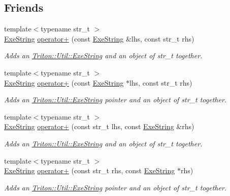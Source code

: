 \subsection*{Friends}
\begin{DoxyCompactItemize}
\item 
{\footnotesize template$<$typename str\+\_\+t $>$ }\\\hyperlink{class_triton_1_1_util_1_1_exe_string}{Exe\+String} \hyperlink{class_triton_1_1_util_1_1_exe_string_a39806d6e0c1844d9e262b196034caafb}{operator+} (const \hyperlink{class_triton_1_1_util_1_1_exe_string}{Exe\+String} \&lhs, const str\+\_\+t rhs)
\begin{DoxyCompactList}\small\item\em Adds an \hyperlink{class_triton_1_1_util_1_1_exe_string}{Triton\+::\+Util\+::\+Exe\+String} and an object of str\+\_\+t together. \end{DoxyCompactList}\item 
{\footnotesize template$<$typename str\+\_\+t $>$ }\\\hyperlink{class_triton_1_1_util_1_1_exe_string}{Exe\+String} \hyperlink{class_triton_1_1_util_1_1_exe_string_ac94b1281e2ba4a38327d8f096009d1e7}{operator+} (const \hyperlink{class_triton_1_1_util_1_1_exe_string}{Exe\+String} $\ast$lhs, const str\+\_\+t rhs)
\begin{DoxyCompactList}\small\item\em Adds an \hyperlink{class_triton_1_1_util_1_1_exe_string}{Triton\+::\+Util\+::\+Exe\+String} pointer and an object of str\+\_\+t together. \end{DoxyCompactList}\item 
{\footnotesize template$<$typename str\+\_\+t $>$ }\\\hyperlink{class_triton_1_1_util_1_1_exe_string}{Exe\+String} \hyperlink{class_triton_1_1_util_1_1_exe_string_a0ea829de41f245abec1708fa2afcc070}{operator+} (const str\+\_\+t lhs, const \hyperlink{class_triton_1_1_util_1_1_exe_string}{Exe\+String} \&rhs)
\begin{DoxyCompactList}\small\item\em Adds an \hyperlink{class_triton_1_1_util_1_1_exe_string}{Triton\+::\+Util\+::\+Exe\+String} and an object of str\+\_\+t together. \end{DoxyCompactList}\item 
{\footnotesize template$<$typename str\+\_\+t $>$ }\\\hyperlink{class_triton_1_1_util_1_1_exe_string}{Exe\+String} \hyperlink{class_triton_1_1_util_1_1_exe_string_a125b93d5ec6b8dd2aab35e1e7b524228}{operator+} (const str\+\_\+t rhs, const \hyperlink{class_triton_1_1_util_1_1_exe_string}{Exe\+String} $\ast$rhs)
\begin{DoxyCompactList}\small\item\em Adds an \hyperlink{class_triton_1_1_util_1_1_exe_string}{Triton\+::\+Util\+::\+Exe\+String} pointer and an object of str\+\_\+t together. \end{DoxyCompactList}\end{DoxyCompactItemize}


